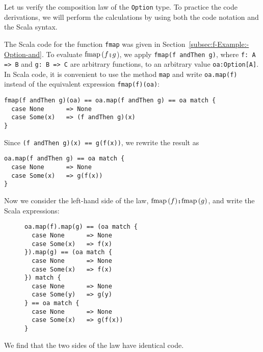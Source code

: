 Let us verify the composition law of the \lstinline!Option! type.
To practice the code derivations, we will perform the calculations
by using both the code notation and the Scala syntax.

The Scala code for the function \lstinline!fmap! was given in Section~\ref{subsec:f-Example:-Option-and}.
To evaluate $\text{fmap}\,(f\bef g$), we apply \lstinline!fmap(f andThen g)!,
where \lstinline!f: A => B! and \lstinline!g: B => C! are arbitrary
functions, to an arbitrary value \lstinline!oa:Option[A]!. In Scala
code, it is convenient to use the  method \lstinline!map! and write
\lstinline!oa.map(f)! instead of the equivalent expression \lstinline!fmap(f)(oa)!:
\begin{lstlisting}
fmap(f andThen g)(oa) == oa.map(f andThen g) == oa match {
  case None      => None
  case Some(x)   => (f andThen g)(x)
}
\end{lstlisting}
Since \lstinline!(f andThen g)(x) == g(f(x))!, we rewrite the result
as
\begin{lstlisting}
oa.map(f andThen g) == oa match {
  case None      => None
  case Some(x)   => g(f(x))
}
\end{lstlisting}
Now we consider the left-hand side of the law, $\text{fmap}\,(f)\bef\text{fmap}\,(g)$,
and write the Scala expressions:

\begin{wrapfigure}{l}{0.33\columnwidth}%
\vspace{-0.8\baselineskip}
\begin{lstlisting}
oa.map(f).map(g) == (oa match {
  case None      => None
  case Some(x)   => f(x)
}).map(g) == (oa match {
  case None      => None
  case Some(x)   => f(x)
}) match {
  case None      => None
  case Some(y)   => g(y)
} == oa match {
  case None      => None
  case Some(x)   => g(f(x))
}
\end{lstlisting}
\vspace{-5\baselineskip}
\end{wrapfigure}%

\noindent We find that the two sides of the law have identical code.

